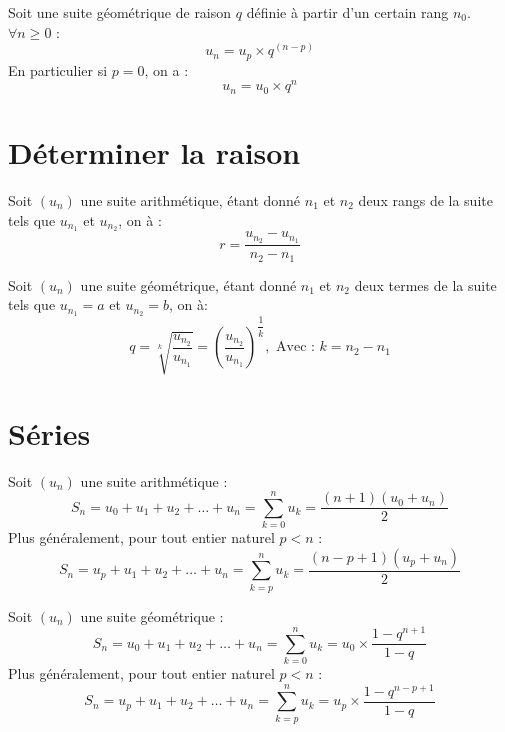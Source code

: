 \documentclass[11pt]{article}
\begin{document}
\begin{multicols}{2}
\begin{theoreme}
Soit une suite géométrique de raison $q$ définie à partir d'un
certain rang $n_0$.\\
$\forall n \ge 0$ :
\[ u_n = u_{p} \times q^{(n-p)}\]
En particulier si $p=0$, on a : 
\[ u_n = u_0 \times q^n\]
\end{theoreme}

\newcolumn

\section{Déterminer la raison}

\begin{propriete}
Soit $(u_n)$ une suite arithmétique, étant donné $n_1$ et $n_2$ deux
rangs de la suite tels que $u_{n_1}$ et $u_{n_2}$, on  à :
\[ r = \dfrac{u_{n_2}-u_{n_1}}{n_2-n_1}\]
\end{propriete}

\begin{propriete}
Soit $(u_n)$ une suite géométrique, étant donné $n_1$ et $n_2$ deux
termes de la suite tels que $u_{n_1}=a$ et $u_{n_2}=b$, on  à:
\[ q = \sqrt[k]{\dfrac{u_{n_2}}{u_{n_1}}} = \left(
 \dfrac{u_{n_2}}{u_{n_1}} \right)^{\dfrac{1}{k}}, \text{ Avec : }
k = n_{2}-n_{1}\]
\end{propriete}

\section{Séries}

\begin{theoreme}
Soit $(u_n)$ une suite arithmétique :
\[ S_n = u_0 + u_1 + u_2 + \ldots + u_n = \sum_{k=0}^{n} u_k = \dfrac{(n+1)(u_0+u_n)}{2} \]
Plus généralement, pour tout entier naturel $p<n$ :
\[S_n = u_p + u_1 + u_2 + \ldots + u_n = \sum_{k=p}^{n} u_k = \dfrac{(n-p+1)(u_p+u_n)}{2} \]
\end{theoreme}

\begin{theoreme}
Soit $(u_n)$ une suite géométrique :
\[ S_n = u_0 + u_1 + u_2 + \ldots + u_n = \sum_{k=0}^{n} u_k = u_0
\times \dfrac{1-q^{n+1}}{1-q} \]
Plus généralement, pour tout entier naturel $p<n$ :
\[ S_n = u_p + u_1 + u_2 + \ldots + u_n = \sum_{k=p}^{n} u_k = u_p
\times \dfrac{1-q^{n-p+1}}{1-q} \]
\end{theoreme}
\end{multicols}
\end{document}
